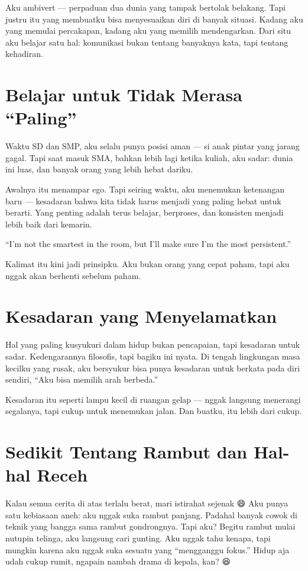 \documentclass[
  letterpaper,
  DIV=11,
  numbers=noendperiod]{scrreprt}
\begin{document}
Aku ambivert --- perpaduan dua dunia yang tampak bertolak belakang. Tapi
justru itu yang membuatku bisa menyesuaikan diri di banyak situasi.
Kadang aku yang memulai percakapan, kadang aku yang memilih
mendengarkan. Dari situ aku belajar satu hal: komunikasi bukan tentang
banyaknya kata, tapi tentang kehadiran.

\section{Belajar untuk Tidak Merasa
``Paling''}\label{belajar-untuk-tidak-merasa-paling}

Waktu SD dan SMP, aku selalu punya posisi aman --- si anak pintar yang
jarang gagal. Tapi saat masuk SMA, bahkan lebih lagi ketika kuliah, aku
sadar: dunia ini luas, dan banyak orang yang lebih hebat dariku.

Awalnya itu menampar ego. Tapi seiring waktu, aku menemukan ketenangan
baru --- kesadaran bahwa kita tidak harus menjadi yang paling hebat
untuk berarti. Yang penting adalah terus belajar, berproses, dan
konsisten menjadi lebih baik dari kemarin.

``I'm not the smartest in the room, but I'll make sure I'm the most
persistent.''

Kalimat itu kini jadi prinsipku. Aku bukan orang yang cepat paham, tapi
aku nggak akan berhenti sebelum paham.

\section{Kesadaran yang
Menyelamatkan}\label{kesadaran-yang-menyelamatkan}

Hal yang paling kusyukuri dalam hidup bukan pencapaian, tapi kesadaran
untuk sadar. Kedengarannya filosofis, tapi bagiku ini nyata. Di tengah
lingkungan masa kecilku yang rusak, aku bersyukur bisa punya kesadaran
untuk berkata pada diri sendiri, ``Aku bisa memilih arah berbeda.''

Kesadaran itu seperti lampu kecil di ruangan gelap --- nggak langsung
menerangi segalanya, tapi cukup untuk menemukan jalan. Dan buatku, itu
lebih dari cukup.

\section{Sedikit Tentang Rambut dan Hal-hal
Receh}\label{sedikit-tentang-rambut-dan-hal-hal-receh}

Kalau semua cerita di atas terlalu berat, mari istirahat sejenak 😄 Aku
punya satu kebiasaan aneh: aku nggak suka rambut panjang. Padahal banyak
cowok di teknik yang bangga sama rambut gondrongnya. Tapi aku? Begitu
rambut mulai nutupin telinga, aku langsung cari gunting. Aku nggak tahu
kenapa, tapi mungkin karena aku nggak suka sesuatu yang ``mengganggu
fokus.'' Hidup aja udah cukup rumit, ngapain nambah drama di kepala,
kan? 😆
\end{document}
